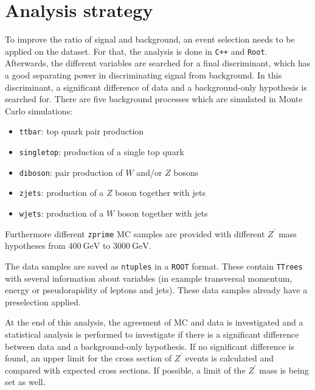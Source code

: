 \section{Analysis strategy}
\label{sec:Analysis-Strategy}
To improve the ratio of signal and background, an event selection needs to be applied on the dataset.
For that, the analysis is done in \texttt{C++} and \texttt{Root}.
Afterwards, the different variables are searched for a final discriminant, which has a good separating power in discriminating signal from background.
In this discriminant, a significant difference of data and a background-only hypothesis is searched for.
There are five background processes which are simulated in Monte Carlo simulations:
\begin{itemize}
  \item \texttt{ttbar}: top quark pair production
  \item \texttt{singletop}: production of a single top quark
  \item \texttt{diboson}: pair production of $W$ and/or $Z$ bosons
  \item \texttt{zjets}: production of a $Z$ boson together with jets
  \item \texttt{wjets}: production of a $W$ boson together with jets
\end{itemize}
Furthermore different \texttt{zprime} MC samples are provided with different $Z^\prime$ mass hypotheses from $\SI{400}{\giga\electronvolt}$ to $\SI{3000}{\giga\electronvolt}$.

The data samples are saved as \texttt{ntuples} in a \texttt{ROOT} format.
These contain \texttt{TTrees} with several information about variables (in example transversal momentum, energy or pseudorapidity of leptons and jets).
These data samples already have a preselection applied.

At the end of this analysis, the agreement of MC and data is investigated and a statistical analysis is performed to investigate if there is a significant difference between data and a background-only hypothesis.
If no significant difference is found, an upper limit for the cross section of $Z^\prime$ events is calculated and compared with expected cross sections.
If possible, a limit of the  $Z^\prime$ mass is being set as well.
